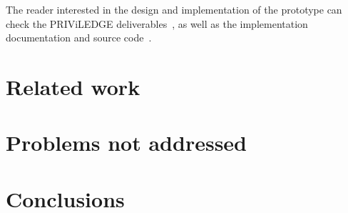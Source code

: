 \documentclass[11pt,a4paper]{article}
\begin{document}
The reader interested in the design and implementation of the prototype can
check the PRIViLEDGE deliverables~\cite{priviledge_d11, priviledge_d12,
  priviledge_d41}, as well as the implementation documentation and source
code~\cite{dsu-repo2021}.

\section{Related work}
\label{sec:related-work}

\section{Problems not addressed}
\label{sec:probl-not-addr}





\section{Conclusions}
\label{sec:conclusions}



\end{document}
